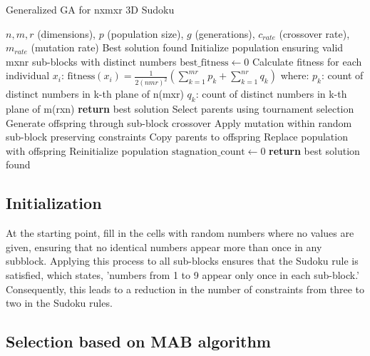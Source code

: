 \documentclass{article}
\begin{document}
\begin{algorithm}
    \caption{Generalized GA for nxmxr 3D Sudoku}
    \label{alg:ga-general}
    \begin{algorithmic}[1]
    \REQUIRE $n,m,r$ (dimensions), $p$ (population size), $g$ (generations), $c_{rate}$ (crossover rate), $m_{rate}$ (mutation rate)
    \ENSURE Best solution found
    \STATE Initialize population ensuring valid mxnr sub-blocks with distinct numbers
    \STATE $\text{best\_fitness} \leftarrow 0$
    \STATE Calculate fitness for each individual $x_i$:
    \STATE $\text{fitness}(x_i) = \frac{1}{2(nmr)^2}\left(\sum_{k=1}^{mr} p_k + \sum_{k=1}^{nr} q_k\right)$
    \STATE where:
    \STATE $p_k$: count of distinct numbers in k-th plane of n(mxr)
    \STATE $q_k$: count of distinct numbers in k-th plane of m(rxn)
    \STATE \textbf{return} best solution
    \ENDIF
    \STATE Select parents using tournament selection
    \STATE Generate offspring through sub-block crossover
    \STATE Apply mutation within random sub-block preserving constraints
    \ENDIF
    \ENDFOR
    \ELSE
    \STATE Copy parents to offspring
    \ENDIF
    \ENDFOR
    \STATE Replace population with offspring
    \STATE Reinitialize population
    \STATE $\text{stagnation\_count} \leftarrow 0$
    \ENDIF
    \ENDFOR
    \STATE \textbf{return} best solution found
    \end{algorithmic}
\end{algorithm}

\newpage

\subsection{Initialization}

At the starting point, fill in the cells with random numbers where no values are given, ensuring that no identical numbers appear more than once in any subblock. Applying this process to all sub-blocks ensures that the Sudoku rule is satisfied, which states, 'numbers from 1 to 9 appear only once in each sub-block.' Consequently, this leads to a reduction in the number of constraints from three to two in the Sudoku rules.

\subsection{Selection based on MAB algorithm}
\end{document}
